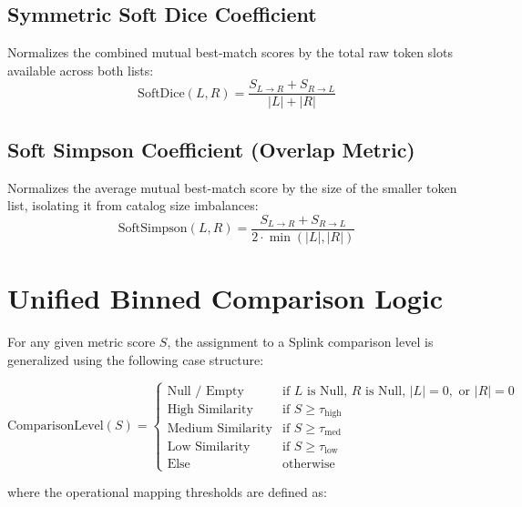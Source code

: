 \subsection{Symmetric Soft Dice Coefficient}
Normalizes the combined mutual best-match scores by the total raw token slots available across both lists:
\begin{equation}
	\text{SoftDice}(L, R) = \frac{S_{L \to R} + S_{R \to L}}{|L| + |R|}
\end{equation}

\subsection{Soft Simpson Coefficient (Overlap Metric)}
Normalizes the average mutual best-match score by the size of the smaller token list, isolating it from catalog size imbalances:
\begin{equation}
	\text{SoftSimpson}(L, R) = \frac{S_{L \to R} + S_{R \to L}}{2 \cdot \min(|L|, |R|)}
\end{equation}

\section{Unified Binned Comparison Logic}
For any given metric score $S$, the assignment to a Splink comparison level is generalized using the following case structure:

\begin{equation}
	\text{ComparisonLevel}(S) =
	\begin{cases}
		\text{Null / Empty}      & \text{if } L \text{ is Null, } R \text{ is Null, } |L|=0, \text{ or } |R|=0 \\
		\text{High Similarity}   & \text{if } S \ge \tau_{\text{high}}                                         \\
		\text{Medium Similarity} & \text{if } S \ge \tau_{\text{med}}                                          \\
		\text{Low Similarity}    & \text{if } S \ge \tau_{\text{low}}                                          \\
		\text{Else}              & \text{otherwise}
	\end{cases}
\end{equation}

where the operational mapping thresholds are defined as:

